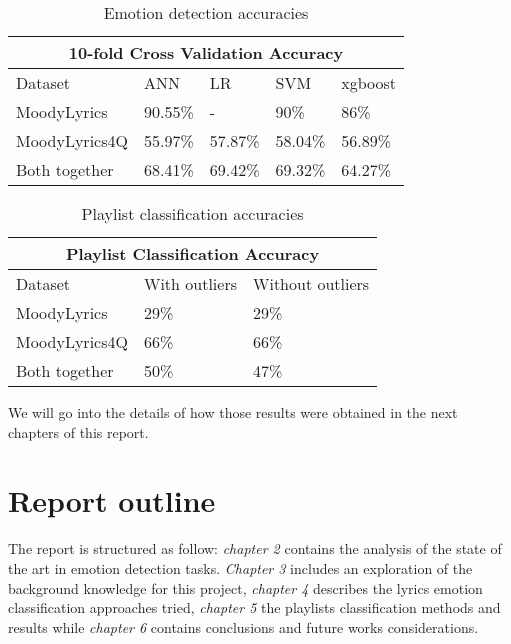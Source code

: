 \begin{table}[H]
\centering
\begin{tabular}{ |p{3cm}||p{1.5cm}|p{1.5cm}|p{1.5cm}|p{1.5cm}|  }
 \hline
 \multicolumn{5}{|c|}{10-fold Cross Validation Accuracy} \\
 \hline
 Dataset & ANN & LR &SVM & xgboost\\
 \hline
MoodyLyrics  & 90.55\%    &- &  90\% & 86\%\\
MoodyLyrics4Q  & 55.97\%    &57.87\% &  58.04\% & 56.89\%\\
Both together &   68.41\%  & 69.42\%   &69.32\% &64.27\%\\
\hline
\end{tabular}
\caption{Emotion detection accuracies} \label{tab:compar}
\end{table}

\begin{table}[H]
\centering
\begin{tabular}{ |p{3cm}||p{1.5cm}|p{1.5cm}| }
 \hline
 \multicolumn{3}{|c|}{Playlist Classification Accuracy} \\
 \hline
Dataset & With outliers & Without outliers\\
 \hline
MoodyLyrics & 29\% & 29\%\\
MoodyLyrics4Q  & 66\%    &66\%\\
Both together &   50\%  & 47\%\\
\hline
\end{tabular}
\caption{Playlist classification accuracies} \label{tab:compar2}
\end{table}

We will go into the details of how those results were obtained in the next chapters of this report.

\section{Report outline}
The report is structured as follow: \textit{chapter 2} contains the analysis of the state of the art in emotion detection tasks. \textit{Chapter 3} includes an exploration of the background knowledge for this project, \textit{chapter 4} describes the lyrics emotion classification approaches tried, \textit{chapter 5} the playlists classification methods and results while \textit{chapter 6} contains conclusions and future works considerations. 










